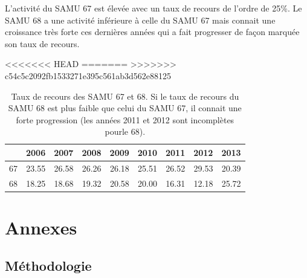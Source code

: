 \documentclass[12pt,english,french,twoside]{book}\usepackage[]{graphicx}\usepackage[]{color}
\begin{document}
L'activité du SAMU 67 est élevée avec un taux de recours de l'ordre de 25\%. Le SAMU 68 a une activité inférieure à celle du SAMU 67 mais connait une croissance très forte ces dernières années qui a fait progresser de façon marquée son taux de recours.

<<<<<<< HEAD
=======
>>>>>>> c54c5c2092fb1533271e395c561ab3d562e88125
\begin{table}[ht]
\centering
\begin{tabular}{rrrrrrrrr}
  \hline
 & 2006 & 2007 & 2008 & 2009 & 2010 & 2011 & 2012 & 2013 \\ 
  \hline
67 & 23.55 & 26.58 & 26.26 & 26.18 & 25.51 & 26.52 & 29.53 & 20.39 \\ 
  68 & 18.25 & 18.68 & 19.32 & 20.58 & 20.00 & 16.31 & 12.18 & 25.72 \\ 
   \hline
\end{tabular}
\caption[Taux de recours des SAMU]{Taux de recours des SAMU 67 et 68. Si le taux de recours du SAMU 68 est plus faible que celui du SAMU 67, il connait une forte progression (les années 2011 et 2012 sont incomplètes pourle 68).} 
\label{fig.rec}
\end{table}








\part{Annexes}

\newpage
\appendix
\chapter{Méthodologie}
\end{document}
